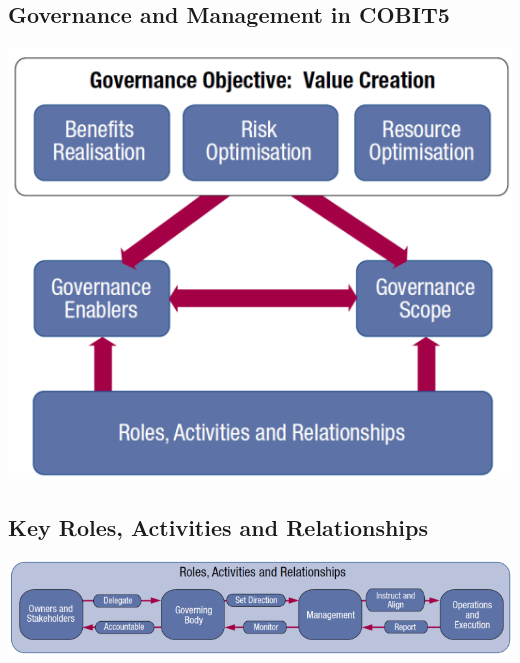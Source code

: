\documentclass[8pt]{extarticle}
\begin{document}
\begin{multicols}{3}
\subsection{Governance and Management in COBIT5}
\begin{center}
    \begin{minipage}{0.5\columnwidth}
        \includegraphics[width=\columnwidth]{governance-management-cobit5.png}
    \end{minipage}
\end{center}

\subsection{Key Roles, Activities and Relationships}
\begin{center}
    \includegraphics[width=\columnwidth]{cobit-key-roles.png}
\end{center}


\end{multicols}
\end{document}
